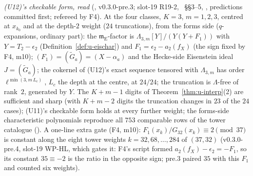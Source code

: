 \documentclass[11pt]{article}
\newcommand{\Iw}{\Lambda}                         %
\newcommand{\Eis}{\mathrm{E}}
\newcommand{\ee}{\epsilon}                        %
\begin{document}
\noindent\emph{(U12)'s checkable form, read} (\COMP, v0.3.0-pre.3; slot-19 R19-2, ~\S\S3--5, , predictions
committed first; refereed by F4). At the four classes, $K=3$, $m=1,2,3$, centred at $x_{k_0}$ and at the depth-$2$ weight ($24$ truncations), from the forms side
($q$-expansions, ordinary part): the $\mathfrak m_\Eis$-factor is $\Iw_{3,m}[Y]/(Y(Y+F_1))$ with $Y=T_2-\ee_2$ (Definition~\ref{def:u-eischar}) and
$F_1=\ee_2-a_2(f_X)$ (the sign fixed by F4, m10); $(F_1)=(\tilde G_a)=(X-\alpha_a)$ and the Hecke-side Eisenstein ideal $J=(\tilde G_a)$; the cokernel of (U12)'s exact
sequence tensored with $\Iw_{3,m}$ has order $\ell^{\min(3,m\,L_c)}$, $L_c$ the depth at the centre, at $24/24$; the truncation is $\Iw$-free of rank~$2$, generated by
$Y$. The $K+m-1$ digits of Theorem~\ref{thm:u-interp}(2) are sufficient and sharp (with $K+m-2$ digits the truncation changes in $23$ of the $24$ cases); (U11)'s
checkable form holds at every further weight; the forms-side characteristic polynomials reproduce all $753$ comparable rows of the tower catalogue
(). A one-line extra gate (F4, m10): $F_1(x_k)/G_{32}(x_k)\equiv2\pmod{37}$ is constant along the eight tower weights
$k=32,68,\dots,284$ of $(37,32)$ (v0.3.0-pre.4, slot-19 WP-HL, which gates it: F4's script formed $a_2(f_X)-\ee_2=-F_1$, so its constant $35\equiv-2$ is the ratio in the
opposite sign; pre.3 paired $35$ with this $F_1$ and counted six weights).
\end{document}
